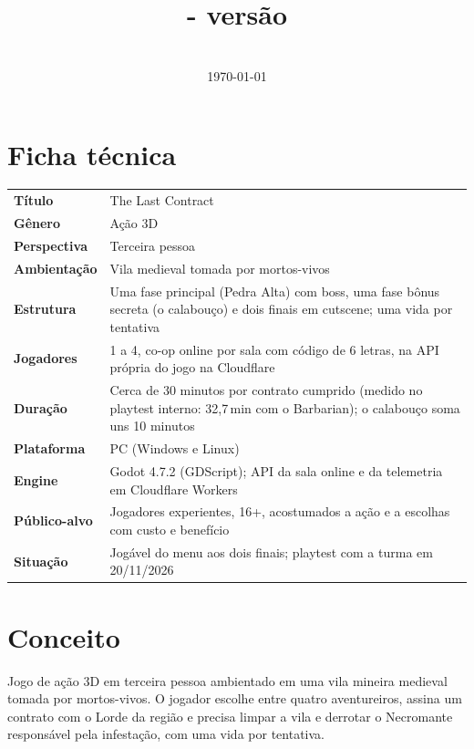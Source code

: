 \documentclass[11pt,a4paper]{article}
\title{\textbf{\jogo} \\ \large \subtitulo{} - versão \gddversao}
\author{\equipe}
\date{\disciplina \\ \today}
\newcommand{\jogo}{The Last Contract}
\begin{document}
\maketitle
\thispagestyle{empty}
\tableofcontents
\newpage

\section{Ficha técnica}

\begin{xltabular}{\textwidth}{@{}lX@{}}
\toprule
\textbf{Título}          & \jogo \\
\textbf{Gênero}          & Ação 3D \\
\textbf{Perspectiva}     & Terceira pessoa \\
\textbf{Ambientação}     & Vila medieval tomada por mortos-vivos \\
\textbf{Estrutura}       & Uma fase principal (Pedra Alta) com boss, uma fase bônus secreta (o calabouço) e dois finais em cutscene; uma vida por tentativa \\
\textbf{Jogadores}       & 1 a 4, co-op online por sala com código de 6 letras, na API própria do jogo na Cloudflare \\
\textbf{Duração}         & Cerca de 30 minutos por contrato cumprido (medido no playtest interno: 32,7\,min com o Barbarian); o calabouço soma uns 10 minutos \\
\textbf{Plataforma}      & PC (Windows e Linux) \\
\textbf{Engine}          & Godot 4.7.2 (GDScript); API da sala online e da telemetria em Cloudflare Workers \\
\textbf{Público-alvo}    & Jogadores experientes, 16+, acostumados a ação e a escolhas com custo e benefício \\
\textbf{Situação}        & Jogável do menu aos dois finais; playtest com a turma em 20/11/2026 \\
\bottomrule
\end{xltabular}

\section{Conceito}

Jogo de ação 3D em terceira pessoa ambientado em uma vila mineira medieval tomada por mortos-vivos. O jogador escolhe entre quatro aventureiros, assina um contrato com o Lorde da região e precisa limpar a vila e derrotar o Necromante responsável pela infestação, com uma vida por tentativa.
\end{document}

